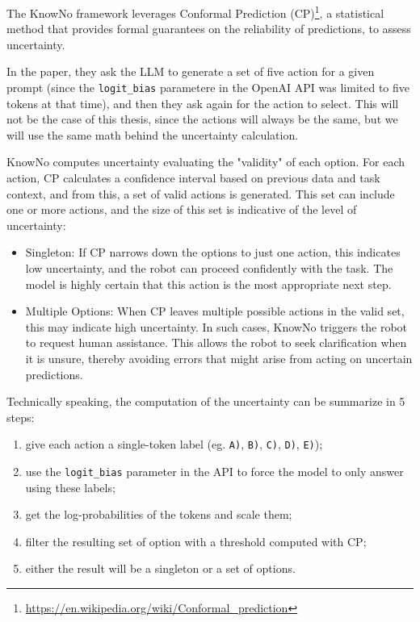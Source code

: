 The KnowNo framework leverages Conformal Prediction (CP)\footnote{\url{https://en.wikipedia.org/wiki/Conformal_prediction}},
a statistical method that provides formal guarantees on the reliability of predictions,
to assess uncertainty.

In the paper, they ask the LLM to generate a set of five action for a given prompt
(since the \texttt{logit\_bias} parametere in the OpenAI API was limited to five
tokens at that time), and then they ask again for the action to select. This
will not be the case of this thesis, since the actions will always be the same,
but we will use the same math behind the uncertainty calculation.

KnowNo computes uncertainty evaluating the "validity" of each option. For each action,
CP calculates a confidence interval based on previous data and task context, and
from this, a set of valid actions is generated. This set can include one or more
actions, and the size of this set is indicative of the level of uncertainty:
\begin{itemize}
  \item Singleton: If CP narrows down the options to just one action, this indicates
    low uncertainty, and the robot can proceed confidently with the task. The model
    is highly certain that this action is the most appropriate next step.

  \item Multiple Options: When CP leaves multiple possible actions in the valid
    set, this may indicate high uncertainty. In such cases, KnowNo triggers the robot
    to request human assistance. This allows the robot to seek clarification
    when it is unsure, thereby avoiding errors that might arise from acting on uncertain
    predictions.
\end{itemize}

Technically speaking, the computation of the uncertainty can be summarize in 5 steps:
\begin{enumerate}
  \item give each action a single-token label (eg. \texttt{A)}, \texttt{B)}, \texttt{C)},
    \texttt{D)}, \texttt{E)});

  \item use the \texttt{logit\_bias} parameter in the API to force the model to
    only answer using these labels;

  \item get the log-probabilities of the tokens and scale them;

  \item filter the resulting set of option with a threshold computed with CP;

  \item either the result will be a singleton or a set of options.
\end{enumerate}

